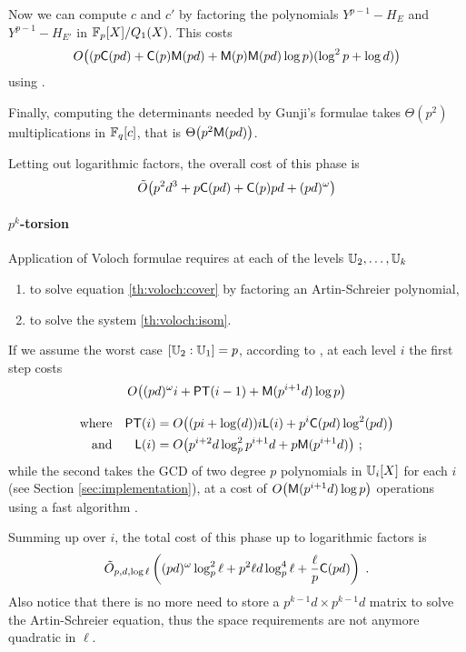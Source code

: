 Now we can compute $c$ and $c'$ by factoring the polynomials
$Y^{p-1}-H_E$ and $Y^{p-1}-H_{E'}$ in $\mathbb{F}_p[X]/Q_1(X)$. This costs
\[O\bigl((p\mathrm{\sf C}(pd) + \mathrm{\sf C}(p)\mathrm{\sf M}(pd) + \mathrm{\sf M}(p)\mathrm{\sf M}(pd)\log
p)(\log^2 p+\log d)\bigr)\]
using \cite[Section 3]{KS97}.

Finally, computing the determinants needed by Gunji's formulae takes
$\Theta(p^2)$ multiplications in $\mathbb{F}_q[c]$, that is
$\Theta\bigl(p^2\mathrm{\sf M}(pd)\bigr)$.

Letting out logarithmic factors, the overall cost of this phase is
\begin{equation}
  \label{eq:gunji-complexity}
  \tilde{O}\bigl(p^2d^3 + p\mathrm{\sf C}(pd) + \mathrm{\sf C}(p)pd + (pd)^\omega \bigr)
\end{equation}


\paragraph{$p^k$-torsion}
Application of Voloch formulae requires at each of the levels
$\mathbb{U}_2,\ldots,\mathbb{U}_k$
\begin{enumerate}
\item to solve equation \eqref{th:voloch:cover} by factoring an
  Artin-Schreier polynomial,
\item to solve the system \eqref{th:voloch:isom}.
\end{enumerate}
If we assume the worst case $[\mathbb{U}_2:\mathbb{U}_1] = p$, according to
\cite[Th. 21]{DFS09}, at each level $i$ the first step costs
\begin{gather*}
  O\bigl((pd)^\omega i + {\sf PT}(i-1) + \mathrm{\sf M}(p^{i+1}d)\log p\bigr)\\[0.3cm]
  \begin{aligned}
    \text{where}&&
    {\sf PT}(i) &= O\bigl((pi + \log(d))i{\sf L}(i) + p^i\mathrm{\sf C}(pd)\log^2(pd)\bigr)\\
    \text{and}&&
    {\sf L}(i) &= O\bigl(p^{i+2}d\log_p^2{p^{i+1}d} + p\mathrm{\sf M}(p^{i+1}d)\bigr)
    \text{ ;}
  \end{aligned}
\end{gather*}
while the second takes the GCD of two degree $p$ polynomials in
$\mathbb{U}_i[X]$ for each $i$ (see Section \ref{sec:implementation}), at a
cost of $O\bigl(\mathrm{\sf M}(p^{i+1}d)\log p\bigr)$ operations using a fast
algorithm \cite[$\S$11.1]{vzGG}.

Summing up over $i$, the total cost of this phase up to logarithmic
factors is
\begin{equation}
  \label{eq:C2-AS:complexity:p^k}
  \tilde{O}_{p,d,\log\ell}\left((pd)^\omega \log_p^2\ell + p^2\ell d\log_p^4\ell +
  \frac{\ell}{p}\mathrm{\sf C}(pd)\right)
  \;\text{.}  
\end{equation}
Also notice that there is no more need to store a $p^{k-1}d\times
p^{k-1}d$ matrix to solve the Artin-Schreier equation, thus the space
requirements are not anymore quadratic in $\ell$.


